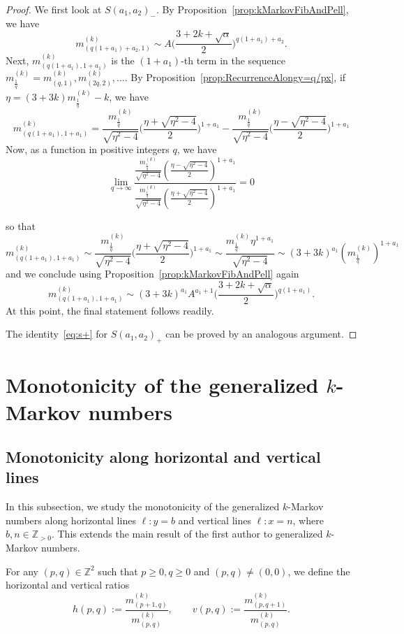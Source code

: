 \documentclass{article}
\theoremstyle{remark}
\newcommand{\mk}{m^{(k)}}
\begin{document}
\begin{proof}
We first look at $S(a_1,a_2)_-$. By Proposition~\ref{prop:kMarkovFibAndPell}, we have \[
\mk_{(q(1+a_1)+a_2,1)} \sim A \bigg(\frac{3 + 2k + \sqrt{\alpha}}{2}\bigg)^{q(1+a_1)+a_2}.
\]
Next, $\mk_{(q(1+a_1),1+a_1)}$ is the $(1+a_1)$-th term in the sequence $\mk_{\frac1q} = \mk_{(q,1)},\mk_{(2q,2)},\ldots$. By Proposition~\ref{prop:RecurrenceAlongy=q/px}, if $\eta = (3+3k)\mk_{\frac1q}-k$, we have 
\[
\mk_{(q(1+a_1),1+a_1)} = \frac{\mk_{\frac1q}}{\sqrt{\eta^2-4}} \bigg(\frac{\eta + \sqrt{\eta^2 - 4}}{2}\bigg)^{1+a_1} - \frac{\mk_{\frac1q}}{\sqrt{\eta^2-4}} \bigg(\frac{\eta - \sqrt{\eta^2 - 4}}{2}\bigg)^{1+a_1} 
\]
Now, as a function in positive integers $q$, we have 
\[
\lim_{q \to \infty} 
\frac{
    \frac{\mk_{\frac1q}}{\sqrt{\eta^2-4}} \left(\frac{\eta - \sqrt{\eta^2 - 4}}{2}\right)^{1+a_1}
}{
    \frac{\mk_{\frac1q}}{\sqrt{\eta^2-4}} \left(\frac{\eta + \sqrt{\eta^2 - 4}}{2}\right)^{1+a_1}
} = 0
\]

so that \[
\mk_{(q(1+a_1),1+a_1)} \sim \frac{\mk_{\frac1q}}{\sqrt{\eta^2-4}} \bigg(\frac{\eta + \sqrt{\eta^2 - 4}}{2}\bigg)^{1+a_1} \sim \frac{\mk_{\frac1q} \eta^{1+a_1}}{\sqrt{\eta^2-4}} \sim (3+3k)^{a_1} (\mk_{\frac1q})^{1+a_1}
\]
and we conclude using Proposition~\ref{prop:kMarkovFibAndPell} again \[
\mk_{(q(1+a_1),1+a_1)} \sim (3+3k)^{a_1} A^{a_1+1} \bigg(\frac{3 + 2k + \sqrt{\alpha}}{2}\bigg)^{q(1+a_1)}.
\]
At this point, the final statement follows readily.

The identity~\eqref{eq:s+} for $S(a_1,a_2)_+$ can be proved by an analogous argument.
\end{proof}


\section{Monotonicity of the generalized $k$-Markov numbers}\label{sec:MainResult}

\subsection{Monotonicity along horizontal and vertical lines}

In this subsection, we study the monotonicity of the generalized $k$-Markov numbers along horizontal lines $\ell: y = b$ and vertical lines $\ell: x = n$, where $b, n \in \mathbb{Z}_{>0}$.  This extends the main result of the first author \cite{banaian2025} to generalized $k$-Markov numbers. 

For any $(p,q) \in \mathbb{Z}^2 $ such that $p \geq 0, q \geq 0$ and $(p,q) \neq (0,0)$,  
 we define the horizontal and vertical ratios
\[
    h(p,q) := \frac{m^{(k)}_{(p+1,q)}}{m^{(k)}_{(p,q)}}, \qquad 
    v(p,q) := \frac{m^{(k)}_{(p,q+1)}}{m^{(k)}_{(p,q)}}.
\]
\end{document}
